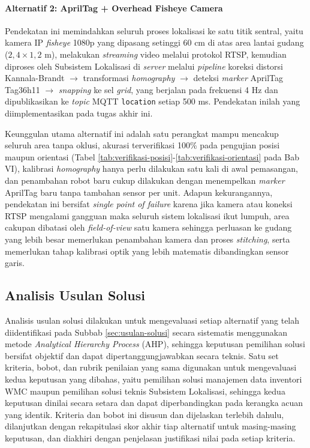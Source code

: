 \paragraph{Alternatif 2: AprilTag + Overhead Fisheye Camera}

Pendekatan ini memindahkan seluruh proses lokalisasi ke satu titik sentral, yaitu kamera IP \textit{fisheye} 1080p yang dipasang setinggi 60 cm di atas area lantai gudang ($2,4\times1,2$ m), melakukan \textit{streaming} video melalui protokol RTSP, kemudian diproses oleh Subsistem Lokalisasi di \textit{server} melalui \textit{pipeline} koreksi distorsi Kannala-Brandt $\rightarrow$ transformasi \textit{homography} $\rightarrow$ deteksi \textit{marker} AprilTag Tag36h11 $\rightarrow$ \textit{snapping} ke sel \textit{grid}, yang berjalan pada frekuensi 4 Hz dan dipublikasikan ke \textit{topic} MQTT \texttt{location} setiap 500 ms. Pendekatan inilah yang diimplementasikan pada tugas akhir ini.

Keunggulan utama alternatif ini adalah satu perangkat mampu mencakup seluruh area tanpa oklusi, akurasi terverifikasi 100\% pada pengujian posisi maupun orientasi (Tabel \ref{tab:verifikasi-posisi}-\ref{tab:verifikasi-orientasi} pada Bab VI), kalibrasi \textit{homography} hanya perlu dilakukan satu kali di awal pemasangan, dan penambahan robot baru cukup dilakukan dengan menempelkan \textit{marker} AprilTag baru tanpa tambahan sensor per unit. Adapun kekurangannya, pendekatan ini bersifat \textit{single point of failure} karena jika kamera atau koneksi RTSP mengalami gangguan maka seluruh sistem lokalisasi ikut lumpuh, area cakupan dibatasi oleh \textit{field-of-view} satu kamera sehingga perluasan ke gudang yang lebih besar memerlukan penambahan kamera dan proses \textit{stitching}, serta memerlukan tahap kalibrasi optik yang lebih matematis dibandingkan sensor garis.

\subsection{Analisis Usulan Solusi}
\label{sec:analisis-usulan-solusi}
Analisis usulan solusi dilakukan untuk mengevaluasi setiap alternatif yang telah diidentifikasi pada Subbab \ref{sec:usulan-solusi} secara sistematis menggunakan metode \textit{Analytical Hierarchy Process} (AHP), sehingga keputusan pemilihan solusi bersifat objektif dan dapat dipertanggungjawabkan secara teknis. Satu set kriteria, bobot, dan rubrik penilaian yang sama digunakan untuk mengevaluasi kedua keputusan yang dibahas, yaitu pemilihan solusi manajemen data inventori WMC maupun pemilihan solusi teknis Subsistem Lokalisasi, sehingga kedua keputusan dinilai secara setara dan dapat diperbandingkan pada kerangka acuan yang identik. Kriteria dan bobot ini disusun dan dijelaskan terlebih dahulu, dilanjutkan dengan rekapitulasi skor akhir tiap alternatif untuk masing-masing keputusan, dan diakhiri dengan penjelasan justifikasi nilai pada setiap kriteria.

